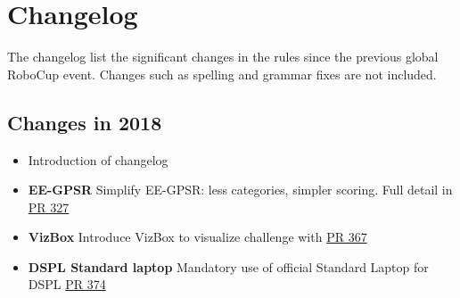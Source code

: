 \section*{Changelog}
The changelog list the significant changes in the rules since the previous global RoboCup event. 
Changes such as spelling and grammar fixes are not included. 
\subsection*{Changes in 2018}

\begin{itemize}
	\item Introduction of changelog
	\item \textbf{EE-GPSR} Simplify EE-GPSR: less categories, simpler scoring. Full detail in \href{https://github.com/RoboCupAtHome/RuleBook/pull/327}{PR 327}
	\item \textbf{VizBox} Introduce VizBox to visualize challenge with \href{https://github.com/RoboCupAtHome/RuleBook/pull/367}{PR 367}
	\item \textbf{DSPL Standard laptop} Mandatory use of official Standard Laptop for DSPL \href{https://github.com/RoboCupAtHome/RuleBook/pull/374}{PR 374}
\end{itemize}